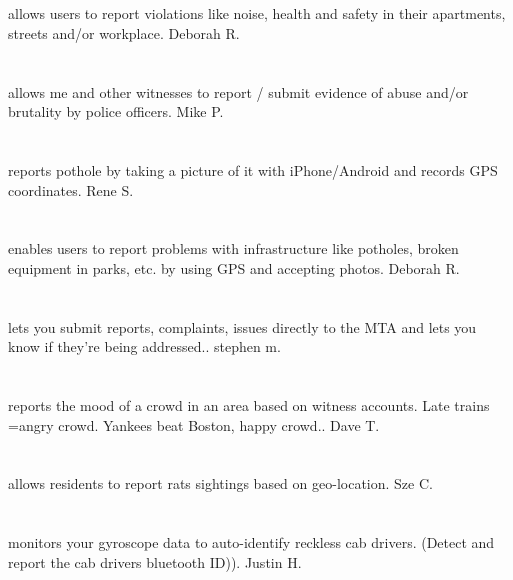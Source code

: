 \section{}allows users to report violations like noise,  health and safety in their apartments,  streets and/or workplace. Deborah R.
\section{}allows me and other witnesses to report / submit evidence of abuse and/or brutality by police officers. Mike P.
\section{}reports pothole by taking a picture of it with iPhone/Android and records GPS coordinates. Rene S.
\section{}enables users to report problems with infrastructure like potholes,  broken equipment in parks,  etc. by using GPS and accepting photos. Deborah R.
\section{}lets you submit reports,  complaints,  issues directly to the MTA and lets you know if they're being addressed.. stephen m.
\section{}reports the mood of a crowd in an area based on witness accounts. Late trains =angry crowd. Yankees beat Boston,  happy crowd.. Dave T.
\section{}allows residents to report rats sightings based on geo-location. Sze C.
\section{}monitors your gyroscope data to auto-identify reckless cab drivers. (Detect and report the cab drivers bluetooth ID)). Justin H.
